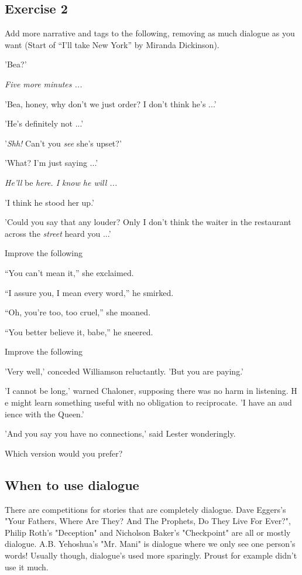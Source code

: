 \documentclass[11pt]{article}
\newenvironment{narrow}[2]{%
 \begin{list}{}{%
  \setlength{\topsep}{0pt}%
  \setlength{\leftmargin}{#1}%
  \setlength{\rightmargin}{#2}%
  \setlength{\listparindent}{\parindent}%
  \setlength{\itemindent}{\parindent}%
  \setlength{\parsep}{\parskip}%
 }%
\item[]}{\end{list}}
\begin{document}
\subsection*{Exercise 2}
Add more narrative and tags to the following, removing as much dialogue as
 you want (Start of ``I'll take New York'' by Miranda Dickinson).
\begin{narrow}{1.0cm}{1.0cm}
'Bea?'

\textit{Five more minutes ...}

'Bea, honey, why don't we just order? I don't think he's ...'

'He's definitely not ...'

'\textit{Shh!} Can't you \textit{see} she's upset?'

'What? I'm just saying ...'

\textit{He'll} be \textit{here. I know he will ...}

'I think he stood her up.'

'Could you say that any louder? Only I don't think the waiter in the restaurant 
across the \textit{street} heard you ...'
\end{narrow}

Improve the following
\begin{narrow}{1.0cm}{1.0cm}
``You can't mean it,'' she exclaimed.

``I assure you, I mean every word,'' he smirked.

``Oh, you're too, too cruel,'' she moaned.

``You better believe it, babe,'' he sneered.

Improve the following

'Very well,' conceded Williamson reluctantly. 'But you are paying.'

'I cannot be long,' warned Chaloner, supposing there was no harm in listening. H
e might learn something useful with no obligation to reciprocate. 'I have an aud
ience with the Queen.'

'And you say you have no connections,' said Lester wonderingly.


\end{narrow}
 Which version would you prefer?

\subsection*{When to use dialogue}
There are competitions for stories that are completely dialogue. Dave Eggers’s "Your Fathers, Where Are They? And The Prophets, Do They Live For Ever?", Philip Roth's "Deception" and Nicholson Baker's "Checkpoint" are all or mostly dialogue. A.B. Yehoshua's "Mr. Mani" is dialogue where we only see one person's words! Usually though, dialogue's used more sparingly. Proust for example didn't use it much.
\end{document}

